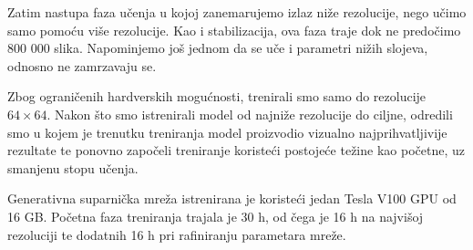 Zatim nastupa faza učenja u kojoj zanemarujemo izlaz niže rezolucije, nego učimo samo pomoću više rezolucije. Kao i stabilizacija, ova faza traje dok ne predočimo 800 000 slika. Napominjemo još jednom da se uče i parametri nižih slojeva, odnosno ne zamrzavaju se.

Zbog ograničenih hardverskih mogućnosti, trenirali smo samo do rezolucije $64 \times 64$. Nakon što smo istrenirali model od najniže rezolucije do ciljne, odredili smo u kojem je trenutku treniranja model proizvodio vizualno najprihvatljivije rezultate te ponovno započeli treniranje koristeći postojeće težine kao početne, uz smanjenu stopu učenja. 

Generativna suparnička mreža istrenirana je koristeći jedan Tesla V100 GPU od 16 GB. Početna faza treniranja trajala je 30 h, od čega je 16 h na najvišoj rezoluciji te dodatnih 16 h pri rafiniranju parametara mreže. 


